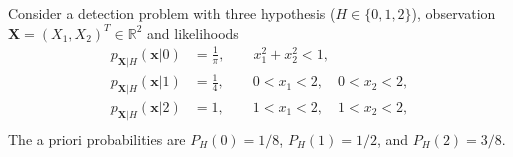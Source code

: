 \question[25] %


Consider a detection problem with three hypothesis ($H \in\{0,1,2\}$), observation $\mathbf{X} = (X_1, X_2)^T \in \mathbb{R}^2$ and likelihoods
\begin{align*}
p_{\mathbf{X}|H}(\mathbf{x}|0) &= \frac{1}{\pi}, \qquad  x_1^2 + x_2^2 < 1,                \\
p_{\mathbf{X}|H}(\mathbf{x}|1) &= \frac{1}{4},   \qquad  0 < x_1 < 2,  \quad 0 < x_2 < 2,   \\
p_{\mathbf{X}|H}(\mathbf{x}|2) &= 1,             \qquad  1 < x_1 < 2,  \quad  1 < x_2 < 2,   \\
\end{align*}
The a priori probabilities are $P_H(0) = 1/8$, $P_H(1) = 1/2$, and $P_H(2) = 3/8$.

